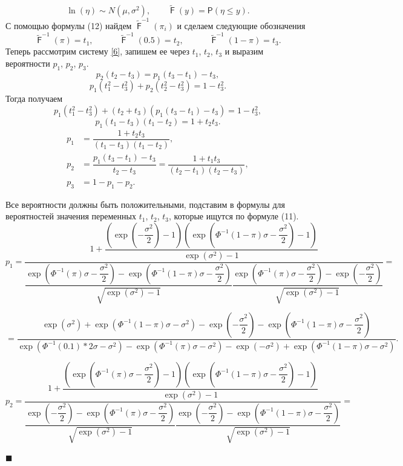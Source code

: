 \documentclass[12pt]{article}
\newenvironment{Proof}{\par\noindent{\bf Доказательство.}}{\hfill$\scriptstyle\blacksquare$}
\DeclareMathOperator{\F}{\mathsf{F}}
\begin{document}
	\begin{Proof}
		\begin{equation*}
			\ln(\eta) \sim N(\mu, \sigma^{2}), \quad\quad \tilde{\F}(y) = \mathsf{P}\left(\eta\leq y \right).
		\end{equation*}
		С помощью формулы (12) найдем $\displaystyle{\tilde{\F}^{-1}(\pi_{i})}$ и сделаем следующие обозначения
		\[\tilde{\F}^{-1}(\pi) = t_{1}, \quad\quad\quad \tilde{\F}^{-1}(0.5) = t_{2}, \quad\quad\quad \tilde{\F}^{-1}(1-\pi) = t_{3}.\]
		Теперь рассмотрим систему \eqref{6}, запишем ее через $t_{1}$, $t_{2}$, $t_{3}$ и выразим вероятности $p_{1}$, $p_{2}$, $p_{3}$.
		\[p_{2}(t_{2}-t_{3})=p_{1}(t_{3}-t_{1})-t_{3},\]
		\[p_{1}(t_{1}^{2}-t_{3}^{2}) + p_{2}(t_{2}^{2} - t_{3}^{2})=1-t_{3}^{2}.\]
		Тогда получаем
		\[p_{1}(t_{1}^{2}-t_{3}^{2}) + (t_{2}+t_{3})(p_{1}(t_{3}-t_{1})-t_{3})=1-t_{3}^{2},\]
		\[p_{1}(t_{1}-t_{3})(t_{1}-t_{2})=1+t_{2}t_{3}.\]
		\begin{align}
			p_{1} &= \dfrac{1+t_{2}t_{3}}{(t_{1}-t_{3})(t_{1}-t_{2})}, \label{15}\\
			p_{2} &= \dfrac{p_{1}(t_{3}-t_{1})-t_{3}}{t_{2}-t_{3}}=\dfrac{1+t_{1}t_{3}}{(t_{2}-t_{1})(t_{2}-t_{3})}, \label{16}\\
			p_{3} &= 1-p_{1}-p_{2}. \label{17}
		\end{align}
		
		Все вероятности должны быть положительными, подставим в формулы для вероятностей значения переменных $t_{1}$, $t_{2}$, $t_{3}$, которые ищутся по формуле (11).
		\[p_{1}=\dfrac{1+\dfrac{\left( \exp\left( -\dfrac{\sigma^{2}}{2}\right) -1\right) \left( \exp(\Phi^{-1}(1-\pi)\sigma-\dfrac{\sigma^{2}}{2})-1\right) }{\exp(\sigma^{2})-1}}{\dfrac{\exp\left( \Phi^{-1}(\pi)\sigma-\dfrac{\sigma^{2}}{2}\right) -\exp\left( \Phi^{-1}(1-\pi)\sigma-\dfrac{\sigma^{2}}{2}\right) }{\sqrt{\exp(\sigma^{2})-1}}\dfrac{\exp\left( \Phi^{-1}(\pi)\sigma-\dfrac{\sigma^{2}}{2}\right) -\exp\left( -\dfrac{\sigma^{2}}{2}\right) }{\sqrt{\exp(\sigma^{2})-1}}}=\]
		
		\[=\dfrac{\exp(\sigma^{2})+\exp(\Phi^{-1}(1-\pi)\sigma-\sigma^{2})-\exp(-\dfrac{\sigma^{2}}{2})-\exp(\Phi^{-1}(1-\pi)\sigma-\dfrac{\sigma^{2}}{2})}{\exp(\Phi^{-1}(0.1)*2\sigma-\sigma^{2})-\exp(\Phi^{-1}(\pi)\sigma-\sigma^{2})-\exp(-\sigma^{2})+\exp(\Phi^{-1}(1-\pi)\sigma-\sigma^{2})}.\]
		
		\[p_{2}=\dfrac{1+\dfrac{(\exp(\Phi^{-1}(\pi)\sigma-\dfrac{\sigma^{2}}{2})-1)(\exp(\Phi^{-1}(1-\pi)\sigma-\dfrac{\sigma^{2}}{2})-1)}{\exp(\sigma^{2})-1}}{\dfrac{\exp(-\dfrac{\sigma^{2}}{2})-\exp(\Phi^{-1}(\pi)\sigma-\dfrac{\sigma^{2}}{2})}{\sqrt{\exp(\sigma^{2})-1}}\dfrac{\exp(-\dfrac{\sigma^{2}}{2})-\exp(\Phi^{-1}(1-\pi)\sigma-\dfrac{\sigma^{2}}{2})}{\sqrt{\exp(\sigma^{2})-1}}}=\]
		

\end{Proof}
\end{document}
